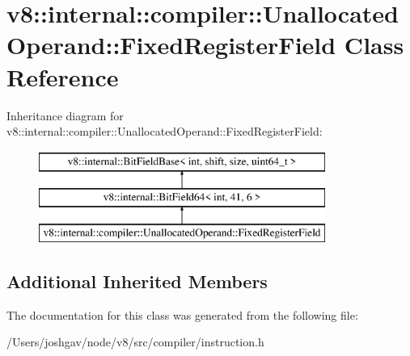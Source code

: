 \hypertarget{classv8_1_1internal_1_1compiler_1_1_unallocated_operand_1_1_fixed_register_field}{}\section{v8\+:\+:internal\+:\+:compiler\+:\+:Unallocated\+Operand\+:\+:Fixed\+Register\+Field Class Reference}
\label{classv8_1_1internal_1_1compiler_1_1_unallocated_operand_1_1_fixed_register_field}
Inheritance diagram for v8\+:\+:internal\+:\+:compiler\+:\+:Unallocated\+Operand\+:\+:Fixed\+Register\+Field\+:\begin{figure}[H]
\begin{center}
\leavevmode
\includegraphics[height=3.000000cm]{classv8_1_1internal_1_1compiler_1_1_unallocated_operand_1_1_fixed_register_field}
\end{center}
\end{figure}
\subsection*{Additional Inherited Members}


The documentation for this class was generated from the following file\+:\begin{DoxyCompactItemize}
\item 
/\+Users/joshgav/node/v8/src/compiler/instruction.\+h\end{DoxyCompactItemize}
